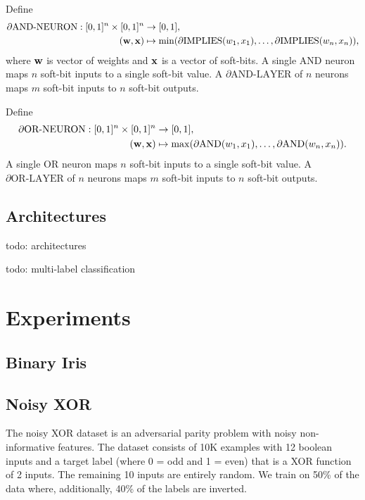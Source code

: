 \documentclass{article} %
\begin{document}

Define
\begin{equation*}
\begin{aligned}
\partial\text{AND-NEURON}: [0,1]^{n} \times [0,1]^{n} &\to [0,1], \\
({\bf w}, {\bf x}) &\mapsto \min(\partial\text{IMPLIES}(w_{1}, x_{1}), \dots, \partial\text{IMPLIES}(w_{n}, x_{n}))\text{,}
\end{aligned}
\end{equation*}
where ${\bf w}$ is vector of weights and ${\bf x}$ is a vector of soft-bits. A single AND neuron maps $n$ soft-bit inputs to a single soft-bit value. A $\partial\text{AND-LAYER}$ of $n$ neurons maps $m$ soft-bit inputs to $n$ soft-bit outputs.

Define
\begin{equation*}
\begin{aligned}
\partial\text{OR-NEURON}: [0,1]^{n} \times [0,1]^{n} &\to [0,1], \\
({\bf w}, {\bf x}) &\mapsto \max(\partial\text{AND}(w_{1}, x_{1}), \dots, \partial\text{AND}(w_{n}, x_{n}))\text{.}
\end{aligned}
\end{equation*}
A single OR neuron maps $n$ soft-bit inputs to a single soft-bit value. A $\partial\text{OR-LAYER}$ of $n$ neurons maps $m$ soft-bit inputs to $n$ soft-bit outputs.

\subsection{Architectures}

todo: architectures

todo: multi-label classification

\section{Experiments}

\subsection{Binary Iris}

\subsection{Noisy XOR}

The noisy XOR dataset \citep{noisy-xor-dataset} is an adversarial parity problem with noisy non-informative features. The dataset consists of 10K examples with 12 boolean inputs and a target label (where 0 = odd and 1 = even) that is a XOR function of 2 inputs. The remaining 10 inputs are entirely random. We train on 50\% of the data where, additionally, 40\% of the labels are inverted.
\end{document}
